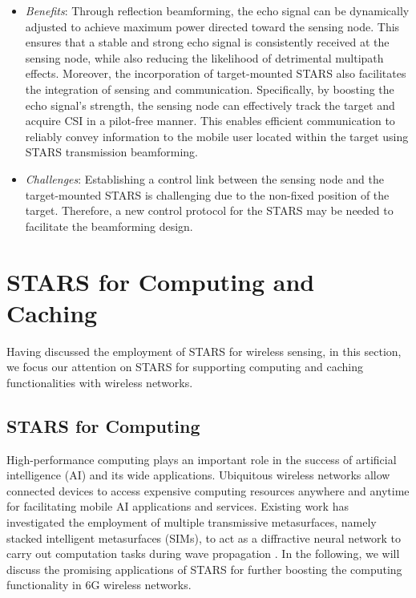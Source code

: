 \documentclass[journal]{IEEEtran}
\theoremstyle{definition}
\begin{document}
\begin{itemize}
    \item \emph{Benefits}: Through reflection beamforming, the echo signal can be dynamically adjusted to achieve maximum power directed toward the sensing node. This ensures that a stable and strong echo signal is consistently received at the sensing node, while also reducing the likelihood of detrimental multipath effects. Moreover, the incorporation of target-mounted STARS also facilitates the integration of sensing and communication. Specifically, by boosting the echo signal's strength, the sensing node can effectively track the target and acquire CSI in a pilot-free manner. This enables efficient communication to reliably convey information to the mobile user located within the target using STARS transmission beamforming.

    \item \emph{Challenges}: Establishing a control link between the sensing node and the target-mounted STARS is challenging due to the non-fixed position of the target. Therefore, a new control protocol for the STARS may be needed to facilitate the beamforming design.
\end{itemize}



\section{STARS for Computing and Caching}
Having discussed the employment of STARS for wireless sensing, in this section, we focus our attention on STARS for supporting computing and caching functionalities with wireless networks.

\subsection{STARS for Computing}
High-performance computing plays an important role in the success of artificial intelligence (AI) and its wide applications. Ubiquitous wireless networks allow connected devices to access expensive computing resources anywhere and anytime for facilitating mobile AI applications and services. Existing work has investigated the employment of multiple transmissive metasurfaces, namely stacked intelligent metasurfaces (SIMs), to act as a diffractive neural network to carry out computation tasks during wave propagation \cite{10515204}. In the following, we will discuss the promising applications of STARS for further boosting the computing functionality in 6G wireless networks.
\end{document}
